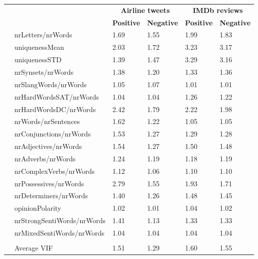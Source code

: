\begin{tabular}{|l|l|l|l|l|l|} \cline{3-6}
\multicolumn{2}{c|}{} & \multicolumn{2}{c|}{\textbf{Airline tweets}} & \multicolumn{2}{c|}{\textbf{IMDb reviews}}\\ \cline{3-6}
\multicolumn{2}{c|}{} & \textbf{Positive} & \textbf{Negative} & \textbf{Positive} & \textbf{Negative} \\ \hline
\parbox[t]{2mm}{} & nrLetters/nrWords & 1.69 & 1.55 & 1.99 & 1.83 \\ 
 & uniquenessMean & 2.03 & 1.72 & 3.23 & 3.17 \\ 
 & uniquenessSTD & 1.39 & 1.47 & 3.29 & 3.16 \\ \hline
\parbox[t]{2mm}{} & nrSynsets/nrWords & 1.38 & 1.20 & 1.33 & 1.36 \\ 
 & nrSlangWords/nrWords & 1.05 & 1.07 & 1.01 & 1.01 \\ 
 & nrHardWordsSAT/nrWords & 1.04 & 1.04 & 1.26 & 1.22 \\ 
 & nrHardWordsDC/nrWords & 2.42 & 1.79 & 2.22 & 1.98 \\ \hline
\parbox[t]{2mm}{} & nrWords/nrSentences & 1.62 & 1.22 & 1.05 & 1.05 \\ 
 & nrConjunctions/nrWords & 1.53 & 1.27 & 1.29 & 1.28 \\ 
 & nrAdjectives/nrWords & 1.54 & 1.27 & 1.50 & 1.48 \\ 
 & nrAdverbs/nrWords & 1.24 & 1.19 & 1.18 & 1.19 \\ 
 & nrComplexVerbs/nrWords & 1.12 & 1.06 & 1.10 & 1.10 \\ 
 & nrPossessives/nrWords & 2.79 & 1.55 & 1.93 & 1.71 \\ 
 & nrDeterminers/nrWords & 1.40 & 1.26 & 1.48 & 1.45 \\ \hline
\parbox[t]{2mm}{} & opinionPolarity & 1.02 & 1.01 & 1.04 & 1.02 \\ 
 & nrStrongSentiWords/nrWords & 1.41 & 1.13 & 1.33 & 1.33 \\ 
 & nrMixedSentiWords/nrWords & 1.04 & 1.04 & 1.04 & 1.04\\ 
  \\ [-1.5ex] \hline
{} & Average VIF & 1.51 & 1.29 & 1.60 & 1.55 \\ 
\end{tabular}